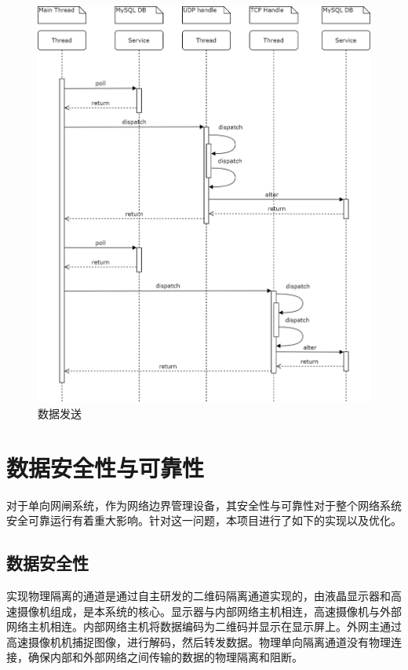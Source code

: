 \begin{figure}[!htbp]
\centering
\includegraphics[scale=0.8]{figures/ST_Send.png}
\caption{数据发送}
\end{figure}

\section{数据安全性与可靠性}

对于单向网闸系统，作为网络边界管理设备，其安全性与可靠性对于整个网络系统安全可靠运行有着重大影响。针对这一问题，本项目进行了如下的实现以及优化。

\subsection{数据安全性}

实现物理隔离的通道是通过自主研发的二维码隔离通道实现的，由液晶显示器和高速摄像机组成，是本系统的核心。显示器与内部网络主机相连，高速摄像机与外部网络主机相连。内部网络主机将数据编码为二维码并显示在显示屏上。外网主通过高速摄像机机捕捉图像，进行解码，然后转发数据。物理单向隔离通道没有物理连接，确保内部和外部网络之间传输的数据的物理隔离和阻断。

